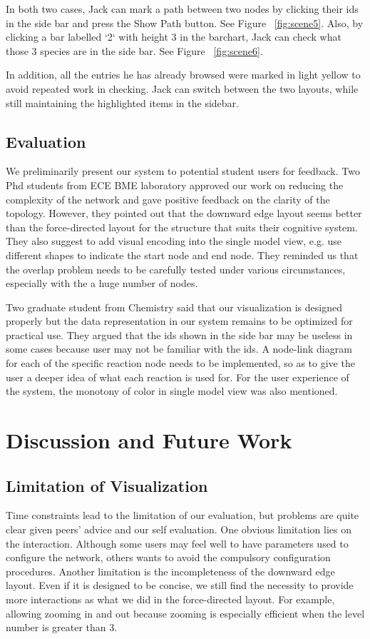 \documentclass[journal]{vgtc}                %
\begin{document}
In both two cases, Jack can mark a path between two nodes by clicking their ids in the side bar and press the Show Path button. See Figure ~\ref{fig:scene5}. Also, by clicking a bar labelled `2` with height 3 in the barchart, Jack can check what those 3 species are in the side bar. See Figure ~\ref{fig:scene6}.

In addition, all the entries he has already browsed were marked in light yellow to avoid repeated work in checking. Jack can switch between the two layouts, while still maintaining the highlighted items in the sidebar.

\subsection{Evaluation}
We preliminarily present our system to potential student users for feedback. Two Phd students from ECE BME laboratory approved our work on reducing the complexity of the network and gave positive feedback on the clarity of the topology. However, they pointed out that the downward edge layout seems better than the force-directed layout for the structure that suits their cognitive system. They also suggest to add visual encoding into the single model view, e.g. use different shapes to indicate the start node and end node. They reminded us that the overlap problem needs to be carefully tested under various circumstances, especially with the a huge number of nodes. 

Two graduate student from Chemistry said that our visualization is designed properly but the data representation in our system remains to be optimized for practical use. They argued that the ids shown in the side bar may be useless in some cases because user may not be familiar with the ids. A node-link diagram for each of the specific reaction node needs to be implemented, so as to give the user a deeper idea of what each reaction is used for. For the user experience of the system, the monotony of color in single model view was also mentioned.




\section{Discussion and Future Work}
\subsection{Limitation of Visualization}
Time constraints lead to the limitation of our evaluation, but problems are quite clear given peers’ advice and our self evaluation. One obvious limitation lies on the interaction. Although some users may feel well to have parameters used to configure the network, others wants to avoid the compulsory configuration procedures. Another limitation is the incompleteness of the downward edge layout. Even if it is designed to be concise, we still find the necessity to provide more interactions as what we did in the force-directed layout. For example, allowing zooming in and out because zooming is especially efficient when the level number is greater than 3.
\end{document}
